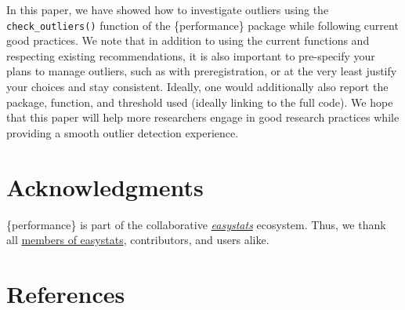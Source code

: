 \documentclass[
]{article}
\begin{document}
In this paper, we have showed how to investigate outliers using the \texttt{check\_outliers()} function of the \{performance\} package while following current good practices. We note that in addition to using the current functions and respecting existing recommendations, it is also important to pre-specify your plans to manage outliers, such as with preregistration, or at the very least justify your choices and stay consistent. Ideally, one would additionally also report the package, function, and threshold used (ideally linking to the full code). We hope that this paper will help more researchers engage in good research practices while providing a smooth outlier detection experience.

\hypertarget{acknowledgments}{%
\section{Acknowledgments}\label{acknowledgments}}

\{performance\} is part of the collaborative \href{https://github.com/easystats/easystats}{\emph{easystats}} ecosystem. Thus, we thank all \href{https://github.com/orgs/easystats/people}{members of easystats}, contributors, and users alike.

\hypertarget{references}{%
\section*{References}\label{references}}
\end{document}
